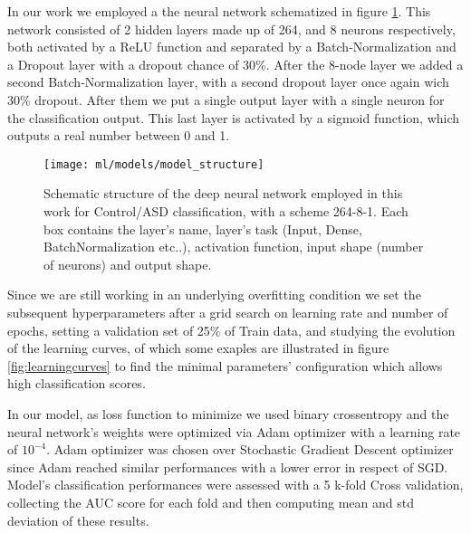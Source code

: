 \documentclass[12pt]{report}
\begin{document}
In our work we employed a the neural network schematized in figure \ref{fig:model_structure}.
This network consisted of 2 hidden layers made up of 264, and 8 neurons respectively, both activated by a ReLU function and separated by a Batch-Normalization and a Dropout layer with a dropout chance of 30\%.
After the 8-node layer we added a second Batch-Normalization layer, with a second dropout layer once again wich 30\% dropout.
After them we put a single output layer with a single neuron for the classification output.
This last layer is activated by a sigmoid function, which outputs a real number between 0 and 1.



\begin{figure}[h!]
\centering
\texttt{[image: ml/models/model\_structure]}
\caption{Schematic structure of the deep neural network employed in this work for Control/ASD classification, with a scheme 264-8-1.
Each box contains the layer's name, layer's task (Input, Dense, BatchNormalization etc..), activation function, input shape (number of neurons) and output shape.}
\label{fig:model_structure}
\end{figure}


Since we are still working in an underlying overfitting condition we set the subsequent hyperparameters after a grid search on learning rate and number of epochs, setting a validation set of 25\% of Train data, and studying the evolution of the learning curves, of which some exaples are illustrated in figure \ref{fig:learningcurves} to find the minimal parameters' configuration which allows high classification scores.

In our model, as loss function to minimize we used binary crossentropy and the neural network's weights were optimized via Adam optimizer with a learning rate of $10^{-4}$.
Adam optimizer was chosen over Stochastic Gradient Descent optimizer since Adam reached similar performances with a lower error in respect of SGD.
Model's classification performances were assessed with a 5 k-fold Cross validation, collecting the AUC score for each fold and then computing mean and std deviation of these results.

\end{document}
